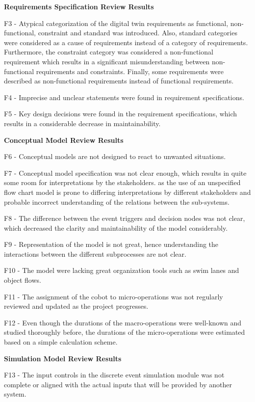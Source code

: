 \documentclass{llncs}
\begin{document}
    \textbf{Requirements Specification Review Results}

    F3 - Atypical categorization of the digital twin requirements as functional, non-functional, constraint and standard was introduced. 
    Also, standard categories were considered as a cause of requirements instead of a category of requirements. Furthermore, 
    the constraint category was considered a non-functional requirement which results in a significant misunderstanding between non-functional 
    requirements and constraints. Finally, some requirements were described as non-functional requirements instead of functional requirements. 

    F4 - Imprecise and unclear statements were found in requirement specifications. 

    F5 - Key design decisions were found in the requirement specifications, which results in a considerable decrease in maintainability. 

    \textbf{Conceptual  Model Review Results}

    F6 - Conceptual models are not designed to react to unwanted situations. 

    F7 - Conceptual model specification was not clear enough, which results in quite some room for interpretations by the stakeholders. 
    as the use of an unspecified flow chart model is prone to differing interpretations by different stakeholders and probable incorrect understanding of the relations between the sub-systems.

    F8 - The difference between the event triggers and decision nodes was not clear, which decreased the clarity and maintainability of the model considerably. 

    F9 - Representation of the model is not great, hence understanding the interactions between the different subprocesses are not clear.

    F10 - The model were lacking great organization tools such as swim lanes and object flows. 

    F11 - The assignment of the cobot to micro-operations was not regularly reviewed and updated as the project progresses. 

    F12 - Even though the durations of the macro-operations were well-known and studied thoroughly before, the durations of the micro-operations were estimated based on a simple calculation scheme.

    \textbf{Simulation Model Review Results}

    F13 - The input controls in the discrete event simulation module was not complete or aligned with the actual inputs that will be provided by another system. 
\end{document}
